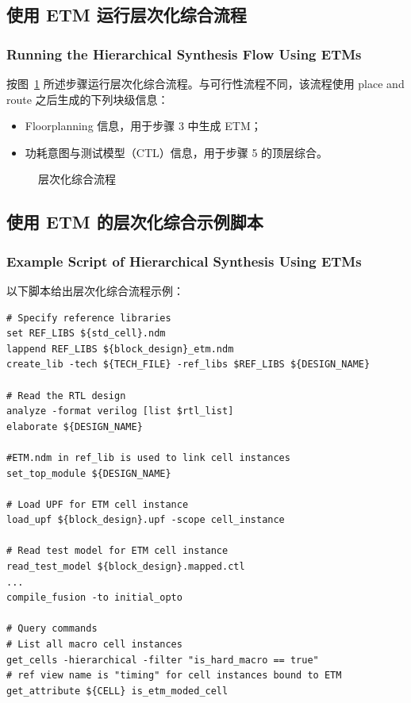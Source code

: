 \subsection{使用 ETM 运行层次化综合流程}
\subsubsection*{Running the Hierarchical Synthesis Flow Using ETMs}

按图~\ref{fig:hier-etm-flow} 所述步骤运行层次化综合流程。与可行性流程不同，该流程使用 place and route 之后生成的下列块级信息：
\begin{itemize}
  \item Floorplanning 信息，用于步骤 3 中生成 ETM；
  \item 功耗意图与测试模型（CTL）信息，用于步骤 5 的顶层综合。
\end{itemize}

\begin{figure}[htbp]
\centering
{}
\caption{层次化综合流程}
\label{fig:hier-etm-flow}
\end{figure}

\subsection{使用 ETM 的层次化综合示例脚本}
\subsubsection*{Example Script of Hierarchical Synthesis Using ETMs}

以下脚本给出层次化综合流程示例：
\begin{lstlisting}
# Specify reference libraries
set REF_LIBS ${std_cell}.ndm
lappend REF_LIBS ${block_design}_etm.ndm
create_lib -tech ${TECH_FILE} -ref_libs $REF_LIBS ${DESIGN_NAME}

# Read the RTL design
analyze -format verilog [list $rtl_list]
elaborate ${DESIGN_NAME}

#ETM.ndm in ref_lib is used to link cell instances
set_top_module ${DESIGN_NAME}

# Load UPF for ETM cell instance
load_upf ${block_design}.upf -scope cell_instance

# Read test model for ETM cell instance
read_test_model ${block_design}.mapped.ctl
...
compile_fusion -to initial_opto

# Query commands
# List all macro cell instances
get_cells -hierarchical -filter "is_hard_macro == true"
# ref view name is "timing" for cell instances bound to ETM
get_attribute ${CELL} is_etm_moded_cell
\end{lstlisting}

